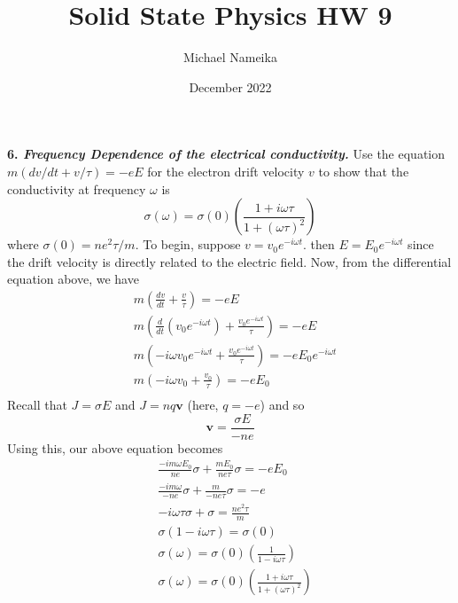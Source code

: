 \documentclass{article}
\title{Solid State Physics HW 9}
\author{Michael Nameika}
\date{December 2022}
\begin{document}
\maketitle

\textbf{6. \textit{Frequency Dependence of the electrical conductivity.} } Use the equation $m(dv/dt + v/\tau) = -eE$ for the electron drift velocity $v$ to show that the conductivity at frequency $\omega$ is
\[\sigma(\omega) = \sigma(0)\left(\frac{1 + i\omega\tau}{1 + (\omega\tau)^2}\right)\]
where $\sigma(0) = ne^2\tau/m$.
\newline\newline
To begin, suppose $v = v_0e^{-i\omega t}$. then $E = E_0e^{-i\omega t}$ since the drift velocity is directly related to the electric field. Now, from the differential equation above, we have
\begin{align*}
    &m\left(\frac{dv}{dt} + \frac{v}{\tau}\right) = -eE \\
    &m\left(\frac{d}{dt}(v_0e^{-i\omega t}) + \frac{v_0e^{-i\omega t}}{\tau}\right) = -eE \\
    &m\left(-i\omega v_0 e^{-i\omega  t} + \frac{v_0e^{-i\omega t}}{\tau}\right) = -eE_0e^{-i\omega t} \\
    &m\left(-i\omega v_0 + \frac{v_0}{\tau}\right) = -eE_0 \\
\end{align*}
Recall that $J = \sigma E$ and $J = nq\mathbf{v}$ (here, $q = -e$) and so 
\[\mathbf{v} = \frac{\sigma E}{-ne}\]
Using this, our above equation becomes
\begin{align*}
    &\frac{-im\omega E_0}{ne}\sigma + \frac{mE_0}{ne\tau}\sigma = -eE_0 \\
    &\frac{-im\omega}{-ne}\sigma + \frac{m}{-ne\tau}\sigma = -e \\
    &-i\omega\tau\sigma + \sigma = \frac{ne^2\tau}{m} \\
    &\sigma(1-i\omega\tau) = \sigma(0) \\
    &\sigma(\omega) = \sigma(0)\left(\frac{1}{1-i\omega\tau}\right) \\
    &\sigma(\omega) = \sigma(0)\left(\frac{1 + i\omega\tau}{1 + (\omega\tau)^2}\right) \\
\end{align*}
\end{document}
